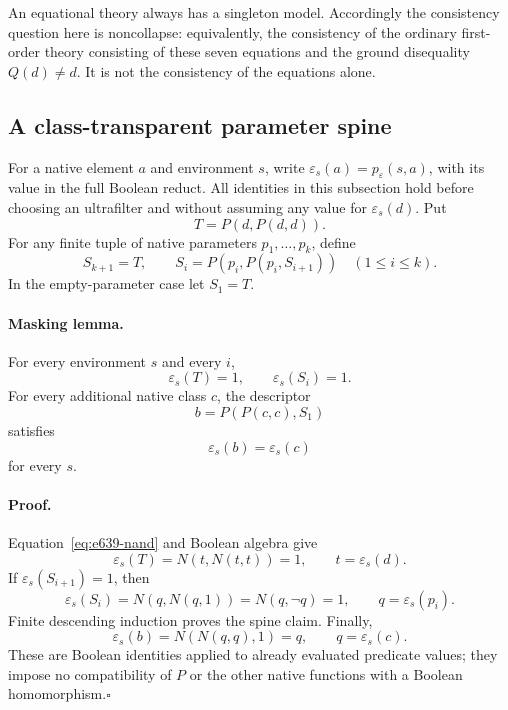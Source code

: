 An equational theory always has a singleton model.  Accordingly the
consistency question here is noncollapse: equivalently, the consistency
of the ordinary first-order theory consisting of these seven equations
and the ground disequality $Q(d)\ne d$.  It is not the consistency of
the equations alone.

\subsection{A class-transparent parameter spine}

For a native element $a$ and environment $s$, write
$\varepsilon_s(a)=p_\varepsilon(s,a)$, with its value in the full
Boolean reduct.  All identities in this subsection hold before choosing
an ultrafilter and without assuming any value for $\varepsilon_s(d)$.
Put
\[
 T=P(d,P(d,d)).
\]
For any finite tuple of native parameters $p_1,\ldots,p_k$, define
\[
 S_{k+1}=T,\qquad
 S_i=P(p_i,P(p_i,S_{i+1}))\quad(1\leq i\leq k).
\]
In the empty-parameter case let $S_1=T$.

\paragraph{Masking lemma.}
For every environment $s$ and every $i$,
\[
 \varepsilon_s(T)=1,\qquad \varepsilon_s(S_i)=1.
\]
For every additional native class $c$, the descriptor
\begin{equation}
                 b=P(P(c,c),S_1)
 \label{eq:e639-maskdescriptor}
\end{equation}
satisfies
\begin{equation}
                         \varepsilon_s(b)=\varepsilon_s(c)
 \label{eq:e639-transparency}
\end{equation}
for every $s$.

\paragraph{Proof.}
Equation~\eqref{eq:e639-nand} and Boolean algebra give
\[
 \varepsilon_s(T)
 =N(t,N(t,t))=1,\qquad t=\varepsilon_s(d).
\]
If $\varepsilon_s(S_{i+1})=1$, then
\[
 \varepsilon_s(S_i)=N(q,N(q,1))=N(q,\neg q)=1,
 \qquad q=\varepsilon_s(p_i).
\]
Finite descending induction proves the spine claim.  Finally,
\[
 \varepsilon_s(b)=N(N(q,q),1)=q,
 \qquad q=\varepsilon_s(c).
\]
These are Boolean identities applied to already evaluated predicate
values; they impose no compatibility of $P$ or the other native
functions with a Boolean homomorphism.\hfill$\square$

